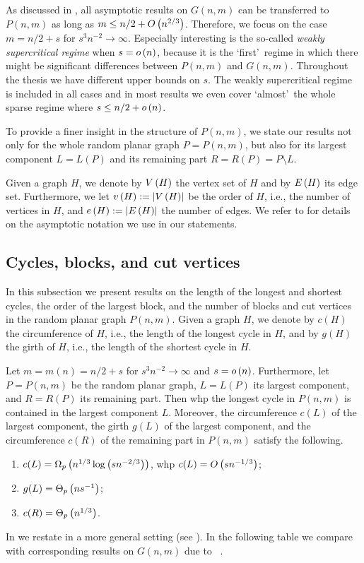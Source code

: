 As discussed in , all asymptotic results on $G(n,m)$ can be transferred to $P(n,m)$ as long as $m\leq n/2+O\left(n^{2/3}\right)$. Therefore, we focus on the case $m=n/2+s$ for $s^3n^{-2}\to \infty$. Especially interesting is the so-called {\em weakly supercritical regime} when $s=o\left(n\right)$, because it is the \lq first\rq\ regime in which there might be significant differences between $P(n,m)$ and $G(n,m)$. Throughout the thesis we have different upper bounds on $s$. The weakly supercritical regime is included in all cases and in most results we even cover \lq almost\rq\ the whole sparse regime where $s\leq n/2+o\left(n\right)$.

To provide a finer insight in the structure of $P(n,m)$, we state our results not only for the whole random planar graph $P=P(n,m)$, but also for its largest component $L=L(P)$ and its remaining part $R=R(P)=P\setminus L$. 

Given a graph $H$, we denote by $V\left(H\right)$ the vertex set of $H$ and by $E\left(H\right)$ its edge set. Furthermore, we let $v\left({H}\right):=\left|V\left(H\right)\right|$ be the order of $H$, i.e., the number of vertices in $H$, and $e\left({H}\right):=\left|E\left(H\right)\right|$ the number of edges. We refer to  for details on the asymptotic notation we use in our statements.

\subsection{Cycles, blocks, and cut vertices}\label{subsec:results_cycles}
In this subsection we present results on the length of the longest and shortest cycles, the order of the largest block, and the number of blocks and cut vertices in the random planar graph $P(n,m)$. Given a graph $H$, we denote by $c(H)$ the circumference of $H$, i.e., the length of the longest cycle in $H$, and by $g(H)$ the girth of $H$, i.e., the length of the shortest cycle in $H$.

\begin{thm}\label{thm:main_cycle}
Let $m=m(n)=n/2+s$ for $s^3n^{-2}\to\infty$ and $s=o\left(n\right)$. Furthermore, let $P=P(n,m)$ be the random planar graph, $L=L(P)$ its largest component, and $R=R(P)$ its remaining part. Then whp the longest cycle in $P(n,m)$ is contained in the largest component $L$. Moreover, the circumference $c(L)$ of the largest component, the girth $g(L)$ of the largest component, and the circumference $c(R)$ of the remaining part in $P(n,m)$ satisfy the following. 
\begin{enumerate}
    \item 
    $c(L)=\Omega_p\left(n^{1/3}\log\left(sn^{-2/3}\right)\right)$, whp $c(L)=O\left(sn^{-1/3}\right)$;
    \item
    $g(L)=\Theta_p\left(ns^{-1}\right)$;
    \item
    $c(R)=\Theta_p\left(n^{1/3}\right)$.
\end{enumerate}
\end{thm}
In  we restate  in a more general setting (see ). In the following table we compare  with corresponding results on $G(n,m)$ due to \Luczak\ \cite{Luczak1991b}.


